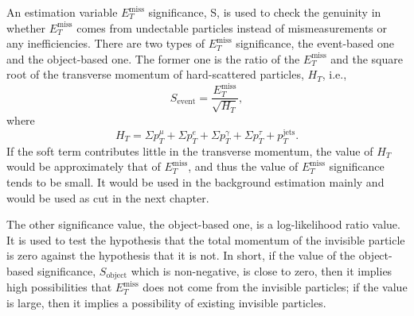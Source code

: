 \documentclass[class=NCU_thesis, crop=false]{standalone}
\begin{document}
	An estimation variable $E_T^{\mathrm{miss}}$ significance, S, is used to check the genuinity in whether $E_T^{\mathrm{miss}}$ comes from undectable particles instead of mismeasurements or any inefficiencies. There are two types of $E_T^{\mathrm{miss}}$ significance, the event-based one and the object-based one. The former one is the ratio of the $E_T^{\mathrm{miss}}$ and the square root of the transverse momentum of hard-scattered particles, $H_T$, i.e.,
	\begin{equation}
		S_{\mathrm{event}} = \frac{E_T^{\mathrm{miss}}}{\sqrt{H_T}},
	\end{equation}
	where
	\begin{equation}
		H_T = \Sigma p_T^{\mu} + \Sigma p_T^e + \Sigma p_T^{\gamma} + \Sigma p_T^{\tau} + p_T^{\mathrm{jets}}.
	\end{equation}
	If the soft term contributes little in the transverse momentum, the value of $H_T$ would be approximately that of $E_T^{\mathrm{miss}}$, and thus the value of $E_T^{\mathrm{miss}}$ significance tends to be small. It would be used in the background estimation mainly and would be used as cut in the next chapter.
	
	The other significance value, the object-based one, is a log-likelihood ratio value. It is used to test the hypothesis that the total momentum of the invisible particle is zero against the hypothesis that it is not. In short, if the value of the object-based significance, $S_{\mathrm{object}}$ which is non-negative, is close to zero, then it implies high possibilities that $E_T^{\mathrm{miss}}$ does not come from the invisible particles; if the value is large, then it implies a possibility of existing invisible particles.
	
\end{document}
